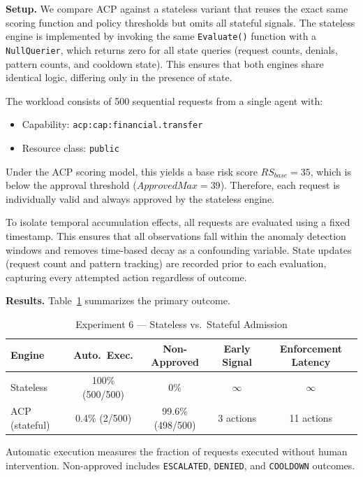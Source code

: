 \documentclass[11pt]{article}
\theoremstyle{definition}
\begin{document}
\textbf{Setup.}
We compare ACP against a stateless variant that reuses the exact same scoring
function and policy thresholds but omits all stateful signals. The stateless
engine is implemented by invoking the same \texttt{Evaluate()} function with a
\texttt{NullQuerier}, which returns zero for all state queries (request counts,
denials, pattern counts, and cooldown state). This ensures that both engines
share identical logic, differing only in the presence of state.

The workload consists of 500 sequential requests from a single agent with:
\begin{itemize}
    \item Capability: \texttt{acp:cap:financial.transfer}
    \item Resource class: \texttt{public}
\end{itemize}
Under the ACP scoring model, this yields a base risk score $RS_{base} = 35$,
which is below the approval threshold ($ApprovedMax = 39$). Therefore, each
request is individually valid and always approved by the stateless engine.

To isolate temporal accumulation effects, all requests are evaluated using a
fixed timestamp. This ensures that all observations fall within the anomaly
detection windows and removes time-based decay as a confounding variable. State
updates (request count and pattern tracking) are recorded prior to each
evaluation, capturing every attempted action regardless of outcome.

\textbf{Results.}
Table~\ref{tab:exp6-summary} summarizes the primary outcome.

\begin{table}[h]
\centering
\caption{Experiment 6 --- Stateless vs.\ Stateful Admission}
\label{tab:exp6-summary}
\begin{tabular}{lcccc}
\toprule
Engine & Auto.\ Exec. & Non-Approved & Early Signal & Enforcement Latency \\
\midrule
Stateless       & 100\% (500/500) & 0\%              & $\infty$  & $\infty$ \\
ACP (stateful)  & 0.4\% (2/500)   & 99.6\% (498/500) & 3 actions & 11 actions \\
\bottomrule
\end{tabular}
\end{table}

Automatic execution measures the fraction of requests executed without human
intervention. Non-approved includes \texttt{ESCALATED}, \texttt{DENIED}, and
\texttt{COOLDOWN} outcomes.
\end{document}
